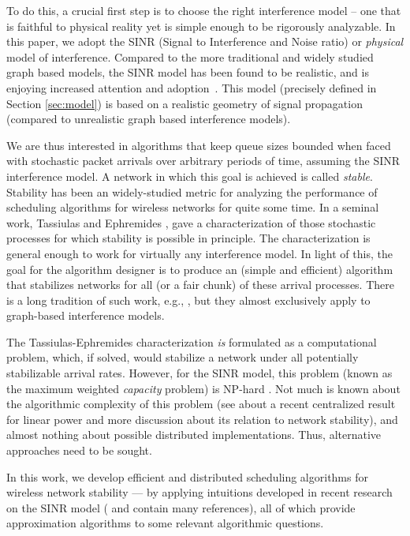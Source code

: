 \documentclass[11pt]{amsart}
\begin{document}
To do this, a crucial first step is to choose the right interference model --
one that is faithful to physical reality yet is simple enough to be rigorously analyzable. In this paper, we adopt the SINR (Signal to Interference and Noise ratio) or \emph{physical} model of interference. Compared to the more traditional and widely studied graph based models, the SINR model has been found to be realistic, and is enjoying
increased attention and adoption~\cite{MaheshwariJD08,Moscibroda2006Protocol,moscibroda06b}. This model (precisely defined in Section \ref{sec:model}) is based on a realistic geometry of signal propagation (compared to unrealistic graph based interference models). 


We are thus interested in algorithms that keep queue sizes bounded
when faced with stochastic packet arrivals over arbitrary periods of
time, assuming the SINR interference model.  A network in which this
goal is achieved is called \emph{stable}.  Stability has been an
widely-studied metric for analyzing the performance of scheduling
algorithms for wireless networks for quite some time.  In a seminal
work, Tassiulas and Ephremides \cite{TE92}, gave a characterization of
those stochastic processes for which stability is possible in
principle. The characterization is general enough to work for
virtually any interference model.  In light of this, the goal for the
algorithm designer is to produce an (simple and efficient) algorithm
that stabilizes networks for all (or a fair chunk) of these arrival
processes.  There is a long tradition of such work, e.g.,
\cite{bestInfocom08,DBLP:conf/sigmetrics/ModianoSZ06},
but they almost exclusively apply to graph-based interference models.

The Tassiulas-Ephremides characterization \emph{is} formulated as a computational problem, which, if solved, would stabilize a network under all potentially stabilizable arrival rates.
However, for the SINR model, this problem (known as the maximum
weighted \emph{capacity} problem) is NP-hard \cite{DBLP:conf/infocom/AndrewsD09}. Not much is known about the algorithmic complexity of this problem (see \cite{infocom12} about a recent centralized result for linear power and more discussion about its relation to network stability), and almost nothing about possible distributed implementations. Thus, alternative approaches need to be sought.

In this work, we develop efficient and distributed
scheduling algorithms for wireless network stability ---
by applying intuitions developed in recent 
research on the SINR model (\cite{SODA11} and \cite{icalp11} contain many references), all of which provide approximation
algorithms to some relevant algorithmic questions.
\end{document}
